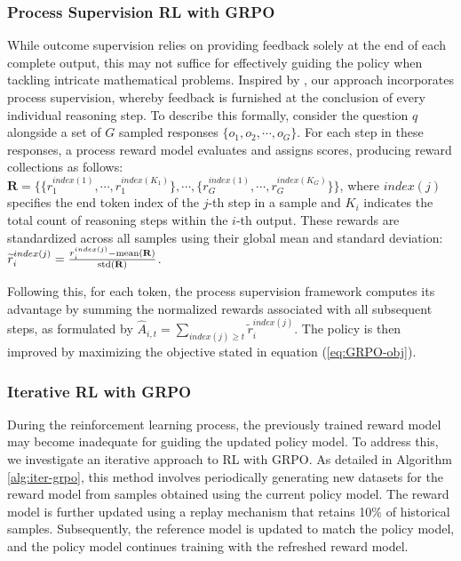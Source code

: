 \begin{itemize}[topsep=0pt]
\begin{itemize}[topsep=0pt]
\subsubsection{Process Supervision RL with GRPO} While outcome supervision relies on providing feedback solely at the end of each complete output, this may not suffice for effectively guiding the policy when tackling intricate mathematical problems. Inspired by \cite{wang2023math}, our approach incorporates process supervision, whereby feedback is furnished at the conclusion of every individual reasoning step. To describe this formally, consider the question $q$ alongside a set of $G$ sampled responses $\{o_1, o_2, \cdots, o_G\}$. For each step in these responses, a process reward model evaluates and assigns scores, producing reward collections as follows: $\mathbf{R} = \{ \{r_1^{index(1)},\cdots,r_1^{index(K_1)}\}, \cdots,  \{r_G^{index(1)},\cdots,r_G^{index(K_G)}\} \}$, where $index(j)$ specifies the end token index of the $j$-th step in a sample and $K_i$ indicates the total count of reasoning steps within the $i$-th output. These rewards are standardized across all samples using their global mean and standard deviation: $\widetilde{r}_i^{index(j)} = \frac{r_i^{index(j)} - {\rm mean(\mathbf{R})}}{{\rm std(\mathbf{R})}}$.

Following this, for each token, the process supervision framework computes its advantage by summing the normalized rewards associated with all subsequent steps, as formulated by $\hat{A}_{i, t} = \sum_{index(j) \ge t} \widetilde{r}_i^{index(j)}$.
The policy is then improved by maximizing the objective stated in equation (\ref{eq:GRPO-obj}).

\subsubsection{Iterative RL with GRPO} During the reinforcement learning process, the previously trained reward model may become inadequate for guiding the updated policy model. To address this, we investigate an iterative approach to RL with GRPO. As detailed in Algorithm \ref{alg:iter-grpo}, this method involves periodically generating new datasets for the reward model from samples obtained using the current policy model. The reward model is further updated using a replay mechanism that retains 10\% of historical samples. Subsequently, the reference model is updated to match the policy model, and the policy model continues training with the refreshed reward model.


\end{itemize}
\end{itemize}
